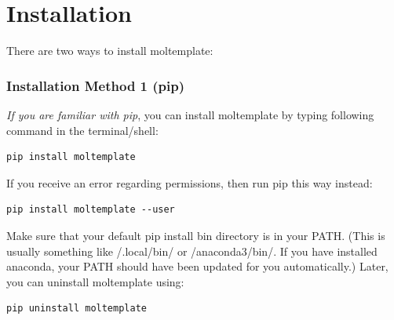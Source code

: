\documentclass[11pt]{article}
\newcommand{\textapprox}{\raisebox{0.5ex}{\texttildelow}}
\begin{document}




\section{Installation}
\label{sec:installation}

There are two ways to install moltemplate:

\subsubsection*{Installation Method 1 (pip)}

\textit{If you are familiar with pip}, you can install
moltemplate by typing following command in the terminal/shell:
\begin{verbatim}
pip install moltemplate
\end{verbatim}
If you receive an error regarding permissions, then run pip this way instead:
\begin{verbatim}
pip install moltemplate --user
\end{verbatim}
Make sure that your default pip install bin directory is in your PATH.  (This is usually something like \textapprox/.local/bin/ or \textapprox/anaconda3/bin/.  If you have installed anaconda, your PATH should have been updated for you automatically.)  Later, you can uninstall moltemplate using:
\begin{verbatim}
pip uninstall moltemplate
\end{verbatim}
\end{document}
